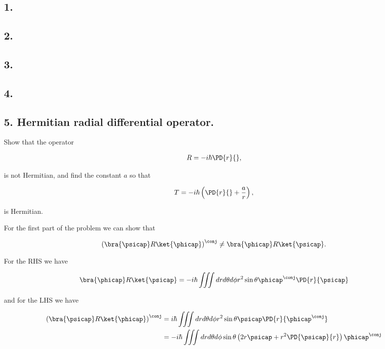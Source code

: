 \subsection{1.}
\subsection{2.}
\subsection{3.}
\subsection{4.}
\subsection{5. Hermitian radial differential operator.}

Show that the operator 

\begin{align*}
R = -i \hbar \PD{r}{},
\end{align*}

is not Hermitian, and find the constant $a$ so that 

\begin{align*}
T = -i \hbar \left( \PD{r}{} + \frac{a}{r} \right),
\end{align*}

is Hermitian.

For the first part of the problem we can show that

\begin{align*}
\left( \bra{\psicap} R \ket{\phicap} \right)^\conj \ne \bra{\phicap} R \ket{\psicap}.
\end{align*}

For the RHS we have

\begin{align*}
\bra{\phicap} R \ket{\psicap} 
= -i \hbar \iiint dr d\theta d\phi r^2 \sin\theta \phicap^\conj \PD{r}{\psicap}
\end{align*}

and for the LHS we have

\begin{align*}
\left( \bra{\psicap} R \ket{\phicap} \right)^\conj
&= i \hbar \iiint dr d\theta d\phi r^2 \sin\theta \psicap \PD{r}{\phicap^\conj} \\
&= -i \hbar \iiint dr d\theta d\phi \sin\theta 
\left( 2 r \psicap 
+ r^2 \PD{\psicap}{r} 
\right)
\phicap^\conj 
\\
\end{align*}

